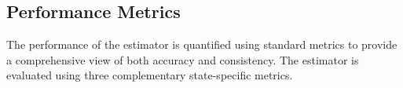 \documentclass[conference]{IEEEtran}
\begin{document}

\subsection{Performance Metrics}
The performance of the estimator is quantified using standard metrics to provide a comprehensive view of both accuracy and consistency. The estimator is evaluated using three complementary state-specific metrics. 
\end{document}
